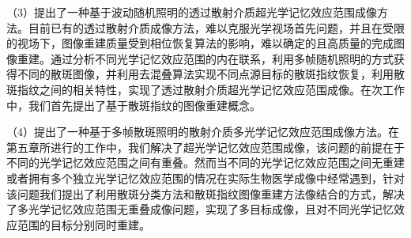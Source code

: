 （3）提出了一种基于波动随机照明的透过散射介质超光学记忆效应范围成像方法。目前已有的透过散射介质成像方法，难以克服光学视场首先问题，并且在受限的视场下，图像重建质量受到相位恢复算法的影响，难以确定的且高质量的完成图像重建。通过分析不同光学记忆效应范围的内在联系，利用多帧随机照明的方式获得不同的散斑图像，并利用去混叠算法实现不同点源目标的散斑指纹恢复，利用散斑指纹之间的相关特性，实现了透过散射介质超光学记忆效应范围成像。在次工作中，我们首先提出了基于散斑指纹的图像重建概念。

（4）提出了一种基于多帧散斑照明的散射介质多光学记忆效应范围成像方法。在第五章所进行的工作中，我们解决了超光学记忆效应范围成像，该问题的前提在于不同的光学记忆效应范围之间有重叠。然而当不同的光学记忆效应范围之间无重建或者拥有多个独立光学记忆效应范围的情况在实际生物医学成像中经常遇到，针对该问题我们提出了利用散斑分类方法和散斑指纹图像重建方法像结合的方式，解决了多光学记忆效应范围无重叠成像问题，实现了多目标成像，且对不同光学记忆效应范围的目标分别同时重建。
